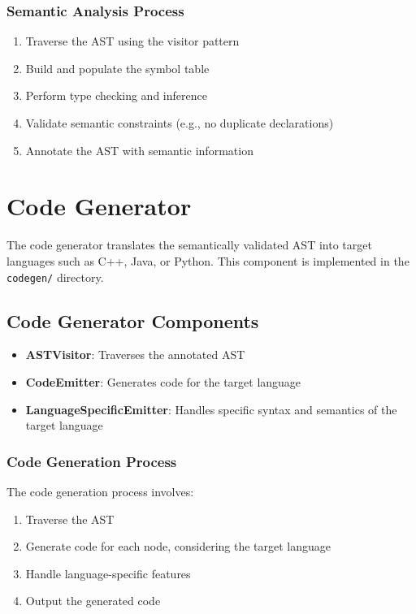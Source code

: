 \documentclass[12pt,a4paper]{article}
\begin{document}
\subsubsection{Semantic Analysis Process}

\begin{enumerate}
    \item Traverse the AST using the visitor pattern
    \item Build and populate the symbol table
    \item Perform type checking and inference
    \item Validate semantic constraints (e.g., no duplicate declarations)
    \item Annotate the AST with semantic information
\end{enumerate}

\section{Code Generator}

The code generator translates the semantically validated AST into target languages such as C++, Java, or Python. This component is implemented in the \texttt{codegen/} directory.

\subsection{Code Generator Components}

\begin{itemize}
    \item \textbf{ASTVisitor}: Traverses the annotated AST
    \item \textbf{CodeEmitter}: Generates code for the target language
    \item \textbf{LanguageSpecificEmitter}: Handles specific syntax and semantics of the target language
\end{itemize}

\subsubsection{Code Generation Process}

The code generation process involves:

\begin{enumerate}
    \item Traverse the AST
    \item Generate code for each node, considering the target language
    \item Handle language-specific features
    \item Output the generated code
\end{enumerate}
\end{document}
